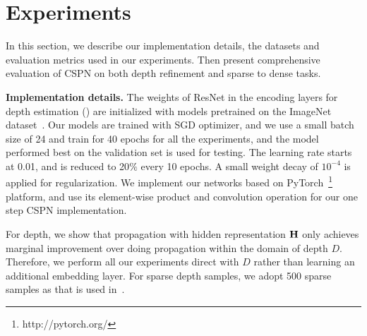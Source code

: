 \section{Experiments}
\label{sec:exp}
In this section, we describe our implementation details, the datasets and evaluation metrics used in our experiments. Then present comprehensive evaluation of CSPN on both depth refinement and sparse to dense tasks. 

\noindent\textbf{Implementation details.}
The weights of ResNet in the encoding layers for depth estimation () are initialized with models pretrained on the
ImageNet dataset~\cite{deng2009imagenet}.  
Our models are trained with SGD optimizer, and we use a small batch size of 24 and train for 40 epochs for all the experiments, and the model performed best on the validation set is used for testing.
The learning rate starts at 0.01, and is reduced to 20$\%$ every 10 epochs. A small weight decay of $10^{-4}$ is applied for regularization.
We implement our networks based on PyTorch~\footnote{http://pytorch.org/} platform, and use its element-wise product and convolution operation for our one step CSPN implementation.

For depth, we show that propagation with hidden representation ${\mathbf H}$ only achieves marginal improvement over doing propagation within the domain of depth $D$. Therefore, we perform all our experiments direct with $D$ rather than learning an additional embedding layer. For sparse depth samples, we adopt 500 sparse samples as that is used in~\cite{Ma2017SparseToDense}.

